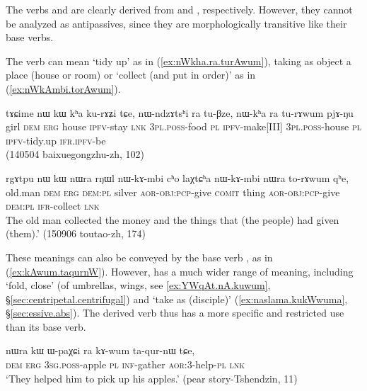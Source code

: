 The verbs  and  are clearly derived from  and , respectively. However, they cannot be analyzed as antipassives, since they are morphologically transitive like their base verbs.

The verb  can mean `tidy up' as in (\ref{ex:nWkha.ra.turAwum}), taking as object a place (house or room) or `collect (and put in order)' as in (\ref{ex:nWkAmbi.torAwum}).

\begin{exe}
\ex \label{ex:nWkha.ra.turAwum}
\gll  tɤɕime nɯ kɯ kʰa ku-rɤʑi tɕe, nɯ-ndzɤtsʰi ra tu-βze, nɯ-kʰa ra tu-rɤwum pjɤ-ŋu \\
girl \textsc{dem} \textsc{erg} house \textsc{ipfv}-stay \textsc{lnk} \textsc{3pl}.\textsc{poss}-food \textsc{pl} \textsc{ipfv}-make[III]  \textsc{3pl}.\textsc{poss}-house \textsc{pl} \textsc{ipfv}-tidy.up \textsc{ifr}.\textsc{ipfv}-be \\
\glt (140504 baixuegongzhu-zh, 102)
\end{exe}

\begin{exe}
\ex \label{ex:nWkAmbi.torAwum}
\gll rgɤtpu nɯ kɯ nɯra rŋɯl nɯ-kɤ-mbi cʰo laχtɕʰa nɯ-kɤ-mbi nɯra to-rɤwum qʰe, \\
old.man \textsc{dem} \textsc{erg} \textsc{dem}:\textsc{pl} silver \textsc{aor}-\textsc{obj}:\textsc{pcp}-give \textsc{comit} thing \textsc{aor}-\textsc{obj}:\textsc{pcp}-give \textsc{dem}:\textsc{pl} \textsc{ifr}-collect \textsc{lnk} \\
\glt  The old man collected the money and the things that (the people) had given (them).' (150906 toutao-zh, 174)
\end{exe}

These meanings can also be conveyed by the base verb , as in (\ref{ex:kAwum.taqurnW}). However,  has a much wider range of meaning, including `fold, close' (of umbrellas, wings, see \ref{ex:YWqAt.nA.kuwum}, §\ref{sec:centripetal.centrifugal}) and `take as (disciple)' (\ref{ex:naslama.kukWwuma}, §\ref{sec:essive.abs}). The derived verb  thus has a more specific and restricted use than its base verb.

\begin{exe}
\ex \label{ex:kAwum.taqurnW}
\gll nɯra kɯ ɯ-paχɕi ra kɤ-wum ta-qur-nɯ tɕe, \\
\textsc{dem} \textsc{erg} \textsc{3sg}.\textsc{poss}-apple \textsc{pl} \textsc{inf}-gather \textsc{aor}:3\flobv{}-help-\textsc{pl} \textsc{lnk} \\
\glt `They helped him to pick up his apples.' (pear story-Tshendzin, 11)
\end{exe}

